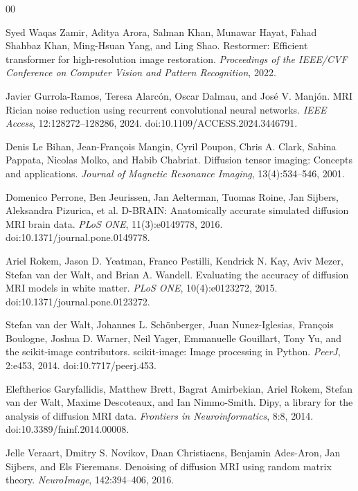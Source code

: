 \documentclass[preprint,12pt]{elsarticle}
\begin{document}

\begin{thebibliography}{00}

  Syed Waqas Zamir, Aditya Arora, Salman Khan, Munawar Hayat, Fahad Shahbaz Khan, Ming-Hsuan Yang, and Ling Shao.
  Restormer: Efficient transformer for high-resolution image restoration.
  \emph{Proceedings of the IEEE/CVF Conference on Computer Vision and Pattern Recognition}, 2022.

  Javier Gurrola-Ramos, Teresa Alarc\'on, Oscar Dalmau, and Jos\'e V. Manj\'on.
  MRI Rician noise reduction using recurrent convolutional neural networks.
  \emph{IEEE Access}, 12:128272--128286, 2024. doi:10.1109/ACCESS.2024.3446791.

  Denis Le Bihan, Jean-Fran\c{c}ois Mangin, Cyril Poupon, Chris A. Clark, Sabina Pappata, Nicolas Molko, and Habib Chabriat.
  Diffusion tensor imaging: Concepts and applications.
  \emph{Journal of Magnetic Resonance Imaging}, 13(4):534--546, 2001.

  Domenico Perrone, Ben Jeurissen, Jan Aelterman, Tuomas Roine, Jan Sijbers, Aleksandra Pizurica, et al.
  D-BRAIN: Anatomically accurate simulated diffusion MRI brain data.
  \emph{PLoS ONE}, 11(3):e0149778, 2016. doi:10.1371/journal.pone.0149778.

  Ariel Rokem, Jason D. Yeatman, Franco Pestilli, Kendrick N. Kay, Aviv Mezer, Stefan van der Walt, and Brian A. Wandell.
  Evaluating the accuracy of diffusion MRI models in white matter.
  \emph{PLoS ONE}, 10(4):e0123272, 2015. doi:10.1371/journal.pone.0123272.

  Stefan van der Walt, Johannes L. Sch\"onberger, Juan Nunez-Iglesias, Fran\c{c}ois Boulogne, Joshua D. Warner, Neil Yager, Emmanuelle Gouillart, Tony Yu, and the scikit-image contributors.
  scikit-image: Image processing in Python.
  \emph{PeerJ}, 2:e453, 2014. doi:10.7717/peerj.453.

  Eleftherios Garyfallidis, Matthew Brett, Bagrat Amirbekian, Ariel Rokem, Stefan van der Walt, Maxime Descoteaux, and Ian Nimmo-Smith.
  Dipy, a library for the analysis of diffusion MRI data.
  \emph{Frontiers in Neuroinformatics}, 8:8, 2014. doi:10.3389/fninf.2014.00008.

  Jelle Veraart, Dmitry S. Novikov, Daan Christiaens, Benjamin Ades-Aron, Jan Sijbers, and Els Fieremans.
  Denoising of diffusion MRI using random matrix theory.
  \emph{NeuroImage}, 142:394--406, 2016.


\end{thebibliography}
\end{document}
